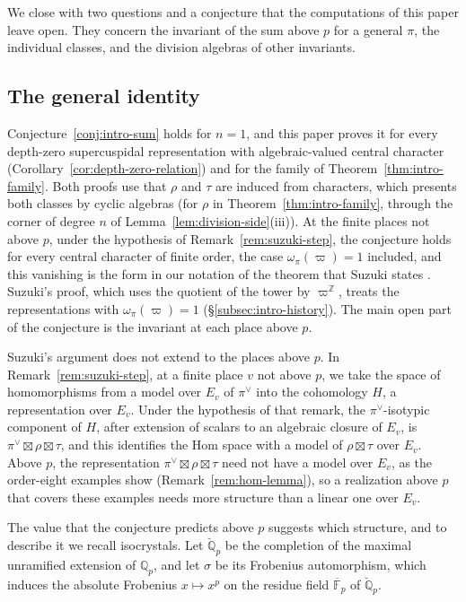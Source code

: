 \documentclass[a4paper,11pt]{amsart}
\theoremstyle{definition}
\theoremstyle{remark}
\numberwithin{equation}{section}
\newcommand{\Q}{\mathbb{Q}}
\newcommand{\Z}{\mathbb{Z}}
\newcommand{\F}{\mathbb{F}}
\newcommand{\Qb}{\breve{\mathbb{Q}}_p}
\begin{document}
We close with two questions and a conjecture that the computations of this paper leave open. They concern the invariant of the sum above $p$ for a general $\pi$, the individual classes, and the division algebras of other invariants.

\subsection{The general identity}\label{subsec:questions-general}

Conjecture~\ref{conj:intro-sum} holds for $n=1$, and this paper proves it for every depth-zero supercuspidal representation with algebraic-valued central character (Corollary~\ref{cor:depth-zero-relation}) and for the family of Theorem~\ref{thm:intro-family}. Both proofs use that $\rho$ and $\tau$ are induced from characters, which presents both classes by cyclic algebras (for $\rho$ in Theorem~\ref{thm:intro-family}, through the corner of degree $n$ of Lemma~\ref{lem:division-side}(iii)). At the finite places not above $p$, under the hypothesis of Remark~\ref{rem:suzuki-step}, the conjecture holds for every central character of finite order, the case $\omega_\pi(\varpi)=1$ included, and this vanishing is the form in our notation of the theorem that Suzuki states \cite[Theorem~4.0.5]{Su23}. Suzuki's proof, which uses the quotient of the tower by $\varpi^{\Z}$, treats the representations with $\omega_\pi(\varpi)=1$ (\S\ref{subsec:intro-history}). The main open part of the conjecture is the invariant at each place above $p$.

Suzuki's argument does not extend to the places above $p$. In Remark~\ref{rem:suzuki-step}, at a finite place $v$ not above $p$, we take the space of homomorphisms from a model over $E_v$ of $\pi^\vee$ into the cohomology $H$, a representation over $E_v$. Under the hypothesis of that remark, the $\pi^\vee$-isotypic component of $H$, after extension of scalars to an algebraic closure of $E_v$, is $\pi^\vee\boxtimes\rho\boxtimes\tau$, and this identifies the Hom space with a model of $\rho\boxtimes\tau$ over $E_v$. Above $p$, the representation $\pi^\vee\boxtimes\rho\boxtimes\tau$ need not have a model over $E_v$, as the order-eight examples show (Remark~\ref{rem:hom-lemma}), so a realization above $p$ that covers these examples needs more structure than a linear one over $E_v$.

The value that the conjecture predicts above $p$ suggests which structure, and to describe it we recall isocrystals. Let $\Qb$ be the completion of the maximal unramified extension of $\Q_p$, and let $\sigma$ be its Frobenius automorphism, which induces the absolute Frobenius $x\mapsto x^p$ on the residue field $\overline{\F}_p$ of $\Qb$.
\end{document}
